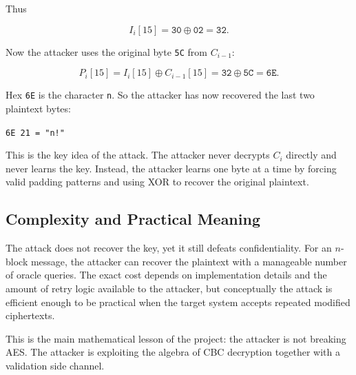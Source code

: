 Thus

\[
I_i[15] = \texttt{30} \oplus \texttt{02} = \texttt{32}.
\]

Now the attacker uses the original byte \texttt{5C} from $C_{i-1}$:

\[
P_i[15] = I_i[15] \oplus C_{i-1}[15]
        = \texttt{32} \oplus \texttt{5C}
        = \texttt{6E}.
\]

Hex \texttt{6E} is the character \texttt{n}. So the attacker has now recovered the last two plaintext bytes:

\begin{center}
\texttt{6E 21 = "n!"}
\end{center}

This is the key idea of the attack. The attacker never decrypts $C_i$ directly and never learns the key. Instead, the attacker learns one byte at a time by forcing valid padding patterns and using XOR to recover the original plaintext.

\subsection{Complexity and Practical Meaning}

The attack does not recover the key, yet it still defeats confidentiality. For an $n$-block message, the attacker can recover the plaintext with a manageable number of oracle queries. The exact cost depends on implementation details and the amount of retry logic available to the attacker, but conceptually the attack is efficient enough to be practical when the target system accepts repeated modified ciphertexts.

This is the main mathematical lesson of the project: the attacker is not breaking AES. The attacker is exploiting the algebra of CBC decryption together with a validation side channel.

